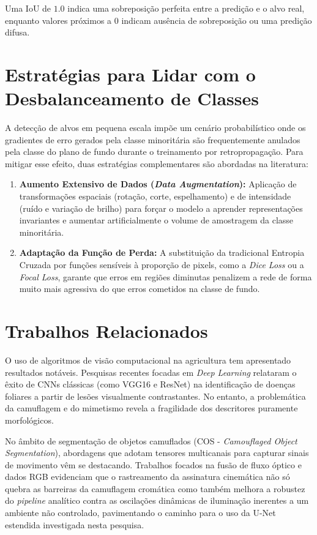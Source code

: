Uma IoU de $1.0$ indica uma sobreposição perfeita entre a predição e o alvo real, enquanto valores próximos a $0$ indicam ausência de sobreposição ou uma predição difusa.

\section{Estratégias para Lidar com o Desbalanceamento de Classes}
\label{sec:desbalanceamento}

A detecção de alvos em pequena escala impõe um cenário probabilístico onde os gradientes de erro gerados pela classe minoritária são frequentemente anulados pela classe do plano de fundo durante o treinamento por retropropagação. Para mitigar esse efeito, duas estratégias complementares são abordadas na literatura:
\begin{enumerate}
    \item \textbf{Aumento Extensivo de Dados (\textit{Data Augmentation}):} Aplicação de transformações espaciais (rotação, corte, espelhamento) e de intensidade (ruído e variação de brilho) para forçar o modelo a aprender representações invariantes e aumentar artificialmente o volume de amostragem da classe minoritária.
    \item \textbf{Adaptação da Função de Perda:} A substituição da tradicional Entropia Cruzada por funções sensíveis à proporção de pixels, como a \textit{Dice Loss} ou a \textit{Focal Loss}, garante que erros em regiões diminutas penalizem a rede de forma muito mais agressiva do que erros cometidos na classe de fundo.
\end{enumerate}

\section{Trabalhos Relacionados}
\label{sec:trabalhos_relacionados}

O uso de algoritmos de visão computacional na agricultura tem apresentado resultados notáveis. Pesquisas recentes focadas em \textit{Deep Learning} relataram o êxito de CNNs clássicas (como VGG16 e ResNet) na identificação de doenças foliares a partir de lesões visualmente contrastantes. No entanto, a problemática da camuflagem e do mimetismo revela a fragilidade dos descritores puramente morfológicos.

No âmbito de segmentação de objetos camuflados (COS - \textit{Camouflaged Object Segmentation}), abordagens que adotam tensores multicanais para capturar sinais de movimento vêm se destacando. Trabalhos focados na fusão de fluxo óptico e dados RGB evidenciam que o rastreamento da assinatura cinemática não só quebra as barreiras da camuflagem cromática como também melhora a robustez do \textit{pipeline} analítico contra as oscilações dinâmicas de iluminação inerentes a um ambiente não controlado, pavimentando o caminho para o uso da U-Net estendida investigada nesta pesquisa.